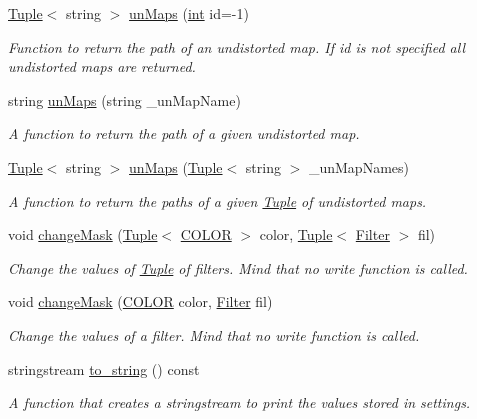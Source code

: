 \begin{DoxyCompactItemize}
\mbox{\hyperlink{class_tuple}{Tuple}}$<$ string $>$ \mbox{\hyperlink{class_settings_a0619c378aff05b5762afe0280b40e07a}{un\+Maps}} (\mbox{\hyperlink{draw_8hh_aa620a13339ac3a1177c86edc549fda9b}{int}} id=-\/1)
\begin{DoxyCompactList}\small\item\em Function to return the path of an undistorted map. If id is not specified all undistorted maps are returned. \end{DoxyCompactList}\item 
string \mbox{\hyperlink{class_settings_a6e62c5eb18f6abc4bcbcd11e018fda8b}{un\+Maps}} (string \+\_\+un\+Map\+Name)
\begin{DoxyCompactList}\small\item\em A function to return the path of a given undistorted map. \end{DoxyCompactList}\item 
\mbox{\hyperlink{class_tuple}{Tuple}}$<$ string $>$ \mbox{\hyperlink{class_settings_aa89550d142cb4101faf35af214f4edff}{un\+Maps}} (\mbox{\hyperlink{class_tuple}{Tuple}}$<$ string $>$ \+\_\+un\+Map\+Names)
\begin{DoxyCompactList}\small\item\em A function to return the paths of a given \mbox{\hyperlink{class_tuple}{Tuple}} of undistorted maps. \end{DoxyCompactList}\item 
void \mbox{\hyperlink{class_settings_ad0d55c536a84990b048463b924c7d88e}{change\+Mask}} (\mbox{\hyperlink{class_tuple}{Tuple}}$<$ \mbox{\hyperlink{class_settings_a30d85f2e06a54ae9bc8da2d01037658f}{C\+O\+L\+OR}} $>$ color, \mbox{\hyperlink{class_tuple}{Tuple}}$<$ \mbox{\hyperlink{class_filter}{Filter}} $>$ fil)
\begin{DoxyCompactList}\small\item\em Change the values of \mbox{\hyperlink{class_tuple}{Tuple}} of filters. Mind that no write function is called. \end{DoxyCompactList}\item 
void \mbox{\hyperlink{class_settings_ad00eb6c82b7e6af5afbb8d881c50dea8}{change\+Mask}} (\mbox{\hyperlink{class_settings_a30d85f2e06a54ae9bc8da2d01037658f}{C\+O\+L\+OR}} color, \mbox{\hyperlink{class_filter}{Filter}} fil)
\begin{DoxyCompactList}\small\item\em Change the values of a filter. Mind that no write function is called. \end{DoxyCompactList}\item 
stringstream \mbox{\hyperlink{class_settings_a20696223267b07d77408e38e87388274}{to\+\_\+string}} () const
\begin{DoxyCompactList}\small\item\em A function that creates a stringstream to print the values stored in settings. \end{DoxyCompactList}\end{DoxyCompactItemize}
